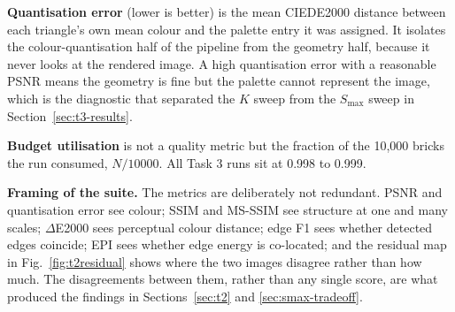 \documentclass[11pt,a4paper]{article}
\begin{document}
\textbf{Quantisation error} (lower is better) is the mean CIEDE2000 distance
between each triangle's own mean colour and the palette entry it was assigned. It
isolates the colour-quantisation half of the pipeline from the geometry half,
because it never looks at the rendered image. A high quantisation error with a
reasonable PSNR means the geometry is fine but the palette cannot represent the
image, which is the diagnostic that separated the $K$ sweep from the $S_{\max}$
sweep in Section~\ref{sec:t3-results}.

\textbf{Budget utilisation} is not a quality metric but the fraction of the
10{,}000 bricks the run consumed, $N / 10000$. All Task 3 runs sit at 0.998 to
0.999.

\textbf{Framing of the suite.} The metrics are deliberately not redundant. PSNR
and quantisation error see colour; SSIM and MS-SSIM see structure at one and
many scales; $\Delta$E2000 sees perceptual colour distance; edge F1 sees whether
detected edges coincide; EPI sees whether edge energy is co-located; and the
residual map in Fig.~\ref{fig:t2residual} shows where the two images disagree
rather than how much. The disagreements between them, rather than any single
score, are what produced the findings in Sections~\ref{sec:t2} and
\ref{sec:smax-tradeoff}.
\end{document}
